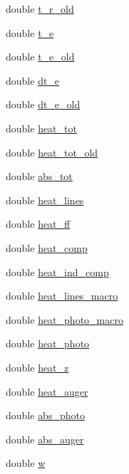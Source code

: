 \begin{DoxyCompactItemize}
\item 
double \hyperlink{structplasma_af2b47aa340055b4dfc21f592a98f9792}{t\+\_\+r\+\_\+old}
\item 
double \hyperlink{structplasma_a9b217285a754e1533f95d92972b6afd6}{t\+\_\+e}
\item 
double \hyperlink{structplasma_aefa8d272f5a54cae990359cccd67075d}{t\+\_\+e\+\_\+old}
\item 
double \hyperlink{structplasma_a174c204665ec6522d9c1dad57408b577}{dt\+\_\+e}
\item 
double \hyperlink{structplasma_a438272ea5c79f26453f113fe023e9c99}{dt\+\_\+e\+\_\+old}
\item 
double \hyperlink{structplasma_a2ed3e67409c1f55ca66cb0cbfbc39ac2}{heat\+\_\+tot}
\item 
double \hyperlink{structplasma_a1cb334619d10653be16138483cf13a8a}{heat\+\_\+tot\+\_\+old}
\item 
double \hyperlink{structplasma_a671e4d660694e4fef07580536f729bfb}{abs\+\_\+tot}
\item 
double \hyperlink{structplasma_ab2b017d6fa0e646a4a1d880d49914ef2}{heat\+\_\+lines}
\item 
double \hyperlink{structplasma_aadd0d71f61d6ed95a48af999a14784e0}{heat\+\_\+ff}
\item 
double \hyperlink{structplasma_ac6e1f1f8827b1bc1a68a437e1e58b001}{heat\+\_\+comp}
\item 
double \hyperlink{structplasma_af28aff5f32398a703d1423c56a4599c2}{heat\+\_\+ind\+\_\+comp}
\item 
double \hyperlink{structplasma_a819b893417ac6c5e2e572dec2f361ac5}{heat\+\_\+lines\+\_\+macro}
\item 
double \hyperlink{structplasma_ad926ff3d325d177b1d767e2a929b6899}{heat\+\_\+photo\+\_\+macro}
\item 
double \hyperlink{structplasma_a2878212449ef25989225a975f81679fd}{heat\+\_\+photo}
\item 
double \hyperlink{structplasma_a5748c6ee35ca4d9458a8bf20d1930b55}{heat\+\_\+z}
\item 
double \hyperlink{structplasma_a878263d85482a81865eb7619b3b2a20e}{heat\+\_\+auger}
\item 
double \hyperlink{structplasma_ab5ee24fc4d7c3533aafdde5591bdc0c4}{abs\+\_\+photo}
\item 
double \hyperlink{structplasma_aa3d84ccfae03d00a3c23d4096e35d942}{abs\+\_\+auger}
\item 
double \hyperlink{structplasma_adbf9689b61e3df7611084d858b3115c0}{w}

\end{DoxyCompactItemize}
